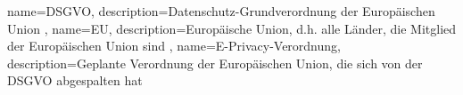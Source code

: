 {   
    name={DSGVO},
    description={Datenschutz-Grundverordnung der Europäischen Union}
},
{
    name={EU},
    description={Europäische Union, d.h. alle Länder, die Mitglied der Europäischen Union sind}
},
{
    name={E-Privacy-Verordnung},
    description={Geplante Verordnung der Europäischen Union, die sich von der DSGVO abgespalten hat}
}

